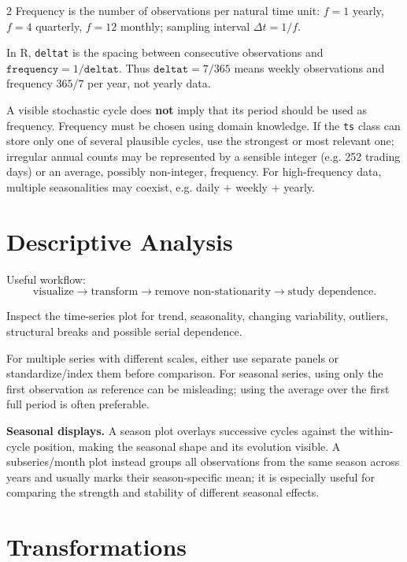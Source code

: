 \documentclass[9pt,a4paper]{extarticle}
\newcommand{\key}[1]{\textbf{#1}}
\begin{document}
\begin{multicols}{2}
Frequency is the number of observations per natural time unit: \(f=1\) yearly, \(f=4\) quarterly, \(f=12\) monthly; sampling interval \(\Delta t=1/f\).

In R, \texttt{deltat} is the spacing between consecutive observations and \(\texttt{frequency}=1/\texttt{deltat}\). Thus \(\texttt{deltat}=7/365\) means weekly observations and frequency \(365/7\) per year, not yearly data.

A visible stochastic cycle does \key{not} imply that its period should be used as frequency. Frequency must be chosen using domain knowledge. If the \texttt{ts} class can store only one of several plausible cycles, use the strongest or most relevant one; irregular annual counts may be represented by a sensible integer (e.g. 252 trading days) or an average, possibly non-integer, frequency. For high-frequency data, multiple seasonalities may coexist, e.g. daily + weekly + yearly.

\section{Descriptive Analysis}

Useful workflow:
\[
\boxed{\text{visualize}\rightarrow\text{transform}\rightarrow
\text{remove non-stationarity}\rightarrow\text{study dependence}}.
\]

Inspect the time-series plot for trend, seasonality, changing variability, outliers, structural breaks and possible serial dependence.

For multiple series with different scales, either use separate panels or standardize/index them before comparison. For seasonal series, using only the first observation as reference can be misleading; using the average over the first full period is often preferable.

\key{Seasonal displays.} A season plot overlays successive cycles against the within-cycle position, making the seasonal shape and its evolution visible. A subseries/month plot instead groups all observations from the same season across years and usually marks their season-specific mean; it is especially useful for comparing the strength and stability of different seasonal effects.

\section{Transformations}


\end{multicols}
\end{document}
